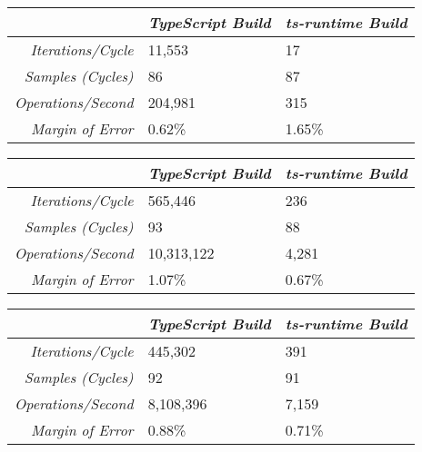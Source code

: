 \begin{center}
{
\centering
\tabulinesep=1.2mm
\setlength{\tabcolsep}{5mm}
\def\arraystretch{1.25}
\small
\begin{tabu} to \textwidth {|r||X[c,m]|X[c,m]|}
  \hline
  & \emph{TypeScript Build} & \emph{ts-runtime Build} \\
  \hline
  \hline
  \emph{Iterations/Cycle}  & 11,553 & 17 \\
  \hline
  \emph{Samples (Cycles)}  & 86 & 87 \\
  \hline
  \emph{Operations/Second} & 204,981 & 315 \\
  \hline
  \emph{Margin of Error}   & 0.62\% & 1.65\% \\
  \hline
\end{tabu}
}
\end{center}

\begin{center}
{
\centering
\tabulinesep=1.2mm
\setlength{\tabcolsep}{5mm}
\def\arraystretch{1.25}
\small
\begin{tabu} to \textwidth {|r||X[c,m]|X[c,m]|}
  \hline
  & \emph{TypeScript Build} & \emph{ts-runtime Build} \\
  \hline
  \hline
  \emph{Iterations/Cycle}  & 565,446 & 236 \\
  \hline
  \emph{Samples (Cycles)}  & 93 & 88 \\
  \hline
  \emph{Operations/Second} & 10,313,122 & 4,281 \\
  \hline
  \emph{Margin of Error}   & 1.07\% & 0.67\% \\
  \hline
\end{tabu}
}
\end{center}

\begin{center}
{
\centering
\tabulinesep=1.2mm
\setlength{\tabcolsep}{5mm}
\def\arraystretch{1.25}
\small
\begin{tabu} to \textwidth {|r||X[c,m]|X[c,m]|}
  \hline
  & \emph{TypeScript Build} & \emph{ts-runtime Build} \\
  \hline
  \hline
  \emph{Iterations/Cycle}  & 445,302 & 391 \\
  \hline
  \emph{Samples (Cycles)}  & 92 & 91 \\
  \hline
  \emph{Operations/Second} & 8,108,396 & 7,159 \\
  \hline
  \emph{Margin of Error}   & 0.88\% & 0.71\% \\
  \hline
\end{tabu}
}
\end{center}

